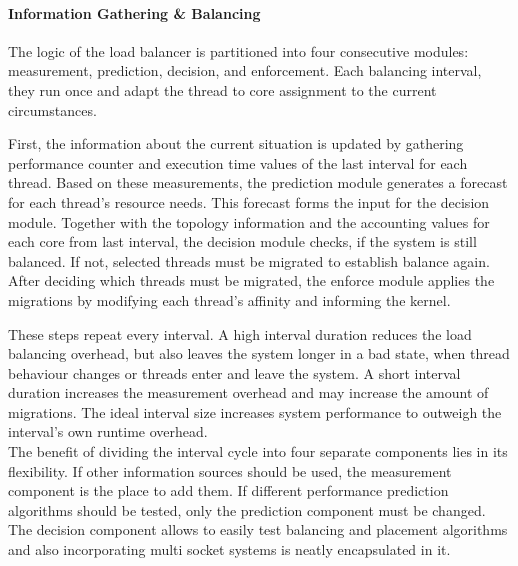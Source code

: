 \paragraph{Information Gathering \& Balancing}
The logic of the load balancer is partitioned into four consecutive modules:
measurement, prediction, decision, and enforcement.
Each balancing interval, they run once and adapt the thread to core
assignment to the current circumstances.

First, the information about the current situation is updated by gathering
performance counter and execution time values of the last interval for each
thread.
Based on these measurements, the prediction module generates a forecast for
each thread's resource needs.
This forecast forms the input for the decision module.
Together with the topology information and the accounting values for each core
from last interval, the decision module checks, if the system is still balanced.
If not, selected threads must be migrated to establish balance again.
After deciding which threads must be migrated, the enforce module applies the
migrations by modifying each thread's affinity and informing the kernel.

These steps repeat every interval. A high interval duration reduces the
load balancing overhead, but also leaves the system longer in a bad state, when
thread behaviour changes or threads enter and leave the system.
A short interval duration increases the measurement overhead and may increase
the amount of migrations.
The ideal interval size increases system performance to outweigh the interval's
own runtime overhead.
\\

The benefit of dividing the interval cycle into four separate components lies
in its flexibility.
If other information sources should be used, the measurement component is the
place to add them.
If different performance prediction algorithms should be tested, only the
prediction component must be changed.
The decision component allows to easily test balancing and placement algorithms
and also incorporating multi socket systems is neatly encapsulated in it.

